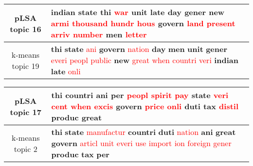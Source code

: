 \begin{center}\begin{tabularx}{\textwidth} {
  | c | >{\raggedright\arraybackslash}X | } \hline 
pLSA topic 16 & \textbf{indian} \textbf{state} \textbf{thi} \textcolor{red}{war} \textbf{unit} \textbf{late} \textbf{day} \textbf{gener} \textbf{new} \textcolor{red}{armi} \textcolor{red}{thousand} \textcolor{red}{hundr} \textcolor{red}{hous} \textbf{govern} \textcolor{red}{land} \textcolor{red}{present} \textcolor{red}{arriv} \textcolor{red}{number} \textbf{men} \textcolor{red}{letter} \\ \hline 
k-means topic 19 & \textbf{thi} \textbf{state} \textcolor{red}{ani} \textbf{govern} \textcolor{red}{nation} \textbf{day} \textbf{men} \textbf{unit} \textbf{gener} \textcolor{red}{everi} \textcolor{red}{peopl} \textcolor{red}{public} \textbf{new} \textcolor{red}{great} \textcolor{red}{when} \textcolor{red}{countri} \textcolor{red}{veri} \textbf{indian} \textbf{late} \textcolor{red}{onli} \\ \hline 
\end{tabularx}

\end{center}

\begin{center}\begin{tabularx}{\textwidth} {
  | c | >{\raggedright\arraybackslash}X | } \hline 
pLSA topic 17 & \textbf{thi} \textbf{countri} \textbf{ani} \textbf{per} \textcolor{red}{peopl} \textcolor{red}{spirit} \textcolor{red}{pay} \textbf{state} \textcolor{red}{veri} \textcolor{red}{cent} \textcolor{red}{when} \textcolor{red}{excis} \textbf{govern} \textcolor{red}{price} \textcolor{red}{onli} \textbf{duti} \textbf{tax} \textcolor{red}{distil} \textbf{produc} \textbf{great} \\ \hline 
k-means topic 2 & \textbf{thi} \textbf{state} \textcolor{red}{manufactur} \textbf{countri} \textbf{duti} \textcolor{red}{nation} \textbf{ani} \textbf{great} \textbf{govern} \textcolor{red}{articl} \textcolor{red}{unit} \textcolor{red}{everi} \textcolor{red}{use} \textcolor{red}{import} \textcolor{red}{ion} \textcolor{red}{foreign} \textcolor{red}{gener} \textbf{produc} \textbf{tax} \textbf{per} \\ \hline 
\end{tabularx}

\end{center}

